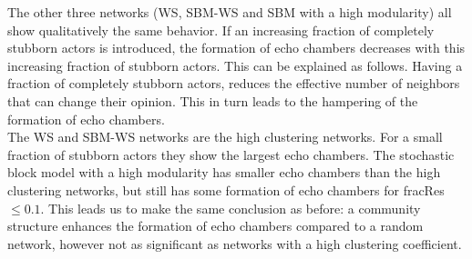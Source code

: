 \documentclass[11 pt , letterpaper , twoside , openright]{book}
\begin{document}
\newline
The other three networks (WS, SBM-WS and SBM with a high modularity) all show qualitatively the same behavior. If an increasing fraction of completely stubborn actors is introduced, the formation of echo chambers decreases with this increasing fraction of stubborn actors. This can be explained as follows. Having a fraction of completely stubborn actors, reduces the effective number of neighbors that can change their opinion. This in turn leads to the hampering of the formation of echo chambers.\\
\newline
The WS and SBM-WS networks are the high clustering networks. For a small fraction of stubborn actors they show the largest echo chambers. The stochastic block model with a high modularity has smaller echo chambers than the high clustering networks, but still has some formation of echo chambers for fracRes $\leqslant 0.1$. This leads us to make the same conclusion as before: a community structure enhances the formation of echo chambers compared to a random network, however not as significant as networks with a high clustering coefficient.
\end{document}
